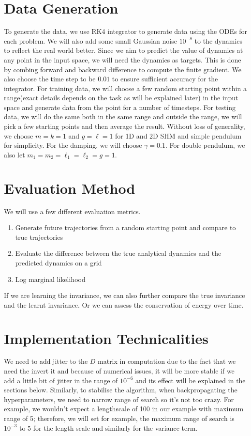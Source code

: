 \documentclass{statsmsc}
\begin{document}
\section{Data Generation}
To generate the data, we use RK4 integrator to generate data using the ODEs for each problem. 
We will also add some small Gaussian noise $10^{-8}$ to the dynamics to reflect the real world better.
Since we aim to predict the value of dynamics at any point in the input space, we will need the dynamics as targets. 
This is done by combing forward and backward difference to compute the finite gradient. 
We also choose the time step to be $0.01$ to ensure sufficient accuracy for the integrator.
For training data, we will choose a few random starting point within a range(exact details depends on the task as will be explained later) in the input space and generate data from the point for a number of timesteps. 
For testing data, we will do the same both in the same range and outside the range, we will pick a few starting points and then average the result.
Without loss of generality, we choose $m=k=1$ and $g=\ell=1$ for 1D and 2D SHM and simple pendulum for simplicity. For the damping, we will choose $\gamma= 0.1$. 
For double pendulum, we also let $m_1=m_2=\ell_1=\ell_2=g=1.$

\section{Evaluation Method}
We will use a few different evaluation metrics. 
\begin{enumerate}
    \item Generate future trajectories from a random starting point and compare to true trajectories
    \item Evaluate the difference between the true analytical dynamics and the predicted dynamics on a grid
    \item Log marginal likelihood
\end{enumerate}
If we are learning the invariance, we can also further compare the true invariance and the learnt invariance.
Or we can assess the conservation of energy over time.

\section{Implementation Technicalities}
We need to add jitter to the $D$ matrix in computation due to the fact that we need the invert it and because of numerical issues, it will be more stable if we add a little bit of jitter in the range of $10^{-6}$ and its effect will be explained in the sections below.
Similarly, to stabilise the algorithm, when backpropagating the hyperparameters, we need to narrow range of search so it's not too crazy. 
For example, we wouldn't expect a lengthscale of 100 in our example with maximum range of 5; therefore, we will set for example, the maximum range of search is $10^{-3}$ to $5$ for the length scale and similarly for the variance term.
\end{document}
